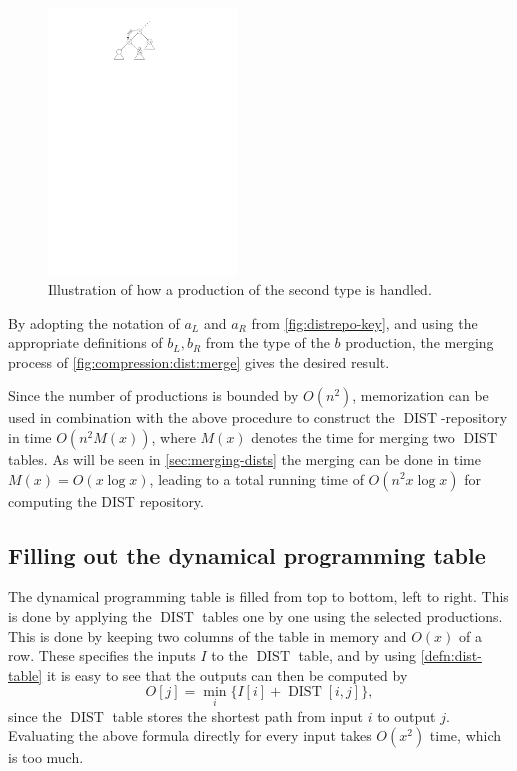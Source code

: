 \documentclass[twoside,11pt,openright]{report}
\newcommand{\DIST}{\operatorname{DIST}}
\begin{document}
\begin{description}
  \begin{figure}[h!]
    \centering
    \includegraphics[width=5cm]{images/distrepo-2nd}
    \caption{Illustration of how a production of the second type is handled.}
    \label{fig:distrepo-2nd}
  \end{figure}

  By adopting the notation of $a_L$ and $a_R$ from \cref{fig:distrepo-key}, and using the appropriate definitions of $b_L, b_R$ from the type of the $b$ production, the merging process of \cref{fig:compression:dist:merge} gives the desired result.
\end{description}
Since the number of productions is bounded by $O(n^2)$, memorization can be used in combination with the above procedure to construct the $\DIST$-repository in time $O(n^2 M(x))$, where $M(x)$ denotes the time for merging two $\DIST$ tables. As will be seen in \cref{sec:merging-dists} the merging can be done in time $M(x) = O(x\log{x})$, leading to a total running time of $O(n^2x\log{x})$ for computing the DIST repository.

\subsection{Filling out the dynamical programming table}
\label{sec:algorithm:filling-grid-overview}
The dynamical programming table is filled from top to bottom, left to right. This is done by applying the $\DIST$ tables one by one using the selected productions. This is done by keeping two columns of the table in memory and $O(x)$ of a row. These specifies the inputs $I$ to the $\DIST$ table, and by using \cref{defn:dist-table} it is easy to see that the outputs can then be computed by
\begin{equation}
  \label{eqn:dist-application}
  O[j] = \min_i \{ I[i] + \DIST[i, j] \},
\end{equation}
since the $\DIST$ table stores the shortest path from input $i$ to output $j$. Evaluating the above formula directly for every input takes $O(x^2)$ time, which is too much.
\end{document}
